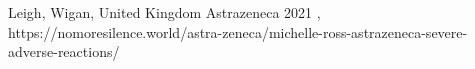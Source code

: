           {
            Leigh, Wigan, United Kingdom
          }
          {
          }
          {
            Astrazeneca
          }
          {
            2021
          }
          {
            ,
          }
          {
            https://nomoresilence.world/astra-zeneca/michelle-ross-astrazeneca-severe-adverse-reactions/
          }


